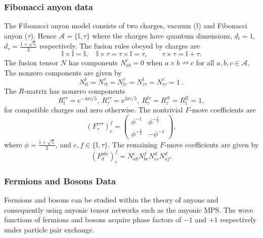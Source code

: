 \documentclass[aps,reprint,superscriptaddress,amsmath,amssymb,amsfonts,prb]{revtex4-1}
\newcommand{\mbb}[1]{\mathbb{#1}}
\begin{document}
\subsubsection{Fibonacci anyon data}
The Fibonacci anyon model consists of two charges, vacuum ($\mathbb{I}$) and Fibonacci anyon ($\tau$). %
Hence $\mathcal{A} = \{\mbb{I},\tau\}$ where the charges have quantum dimensions, $d_\mbb{I} = 1$,  $d_\tau = \frac{1+\sqrt{5}}{2}$ respectively. The fusion rules obeyed by charges are 
\begin{equation}
\mbb{I}\times \mbb{I}=\mbb{I},\quad \mbb{I} \times \tau = \tau \times \mbb{I} = \tau, \qquad  \tau \times \tau = \mbb{I} + \tau.
\end{equation}
The fusion tensor $N$ has components $N_{ab}^c = 0$ when $a \times b \nrightarrow c$ for all $a,b,c \in \mathcal{A}$. The nonzero components are given by 
\begin{equation}
N_{\mbb{I}\mbb{I}}^\mbb{I} = N_{\tau\mbb{I}}^\tau = N_{\mbb{I}\tau}^\tau = N_{\tau\tau}^\mbb{I} = N_{\tau\tau}^\tau = 1 \; . 
\end{equation}
The $R$-matrix has nonzero components
\begin{equation}
R^{\tau\tau}_\mbb{I} = e^{-4\pi i/5}, ~ R^{\tau\tau}_\tau = e^{3\pi i/5} , ~ R^{\mbb{I}\tau}_\tau = R^{\tau\mbb{I}}_\tau = R^{\mbb{I}\mbb{I}}_\mbb{I} = 1 ,
\end{equation}
for compatible charges and zero otherwise. The nontrivial $F$-move coefficients are
\begin{equation}
\left( F^{\tau\tau\tau}_\tau \right)_e^f = 
  \begin{pmatrix}
    \phi^{-1} & \phi^{-\frac{1}{2}} \\
    \phi^{-\frac{1}{2}} & -\phi^{-1} 
  \end{pmatrix} ,
\end{equation}
where $\phi = \frac{1+\sqrt{5}}{2}$, and $e,f \in \{\mbb{I},\tau\}$. The remaining $F$-move coefficients are given by
\begin{equation}
\left( F^{abc}_d \right)_e^f = N_{ab}^e N_{bc}^f N_{ec}^d N_{af}^d .
\end{equation}

\subsubsection{Fermions and Bosons Data}
Fermions and bosons can be studied within the theory of anyons and consequently  using anyonic tensor networks such as the anyonic MPS. The wave functions of fermions and bosons acquire phase factors of $-1$ and $+1$ respectively under particle pair exchange. 
\end{document}
